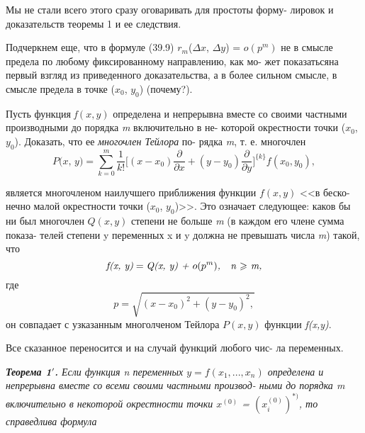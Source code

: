 \documentclass[10pt]{book}
\renewcommand{\geq}{\geqslant}
\begin{document}
\begin{spacing}{0.96}
	   Мы не стали всего этого сразу оговаривать для простоты форму-\linebreak
	   лировок и доказательств теоремы 1 и ее следствия.
		
		Подчеркнем еще, что в формуле (39.9) $r_m$($\Delta x$, $\Delta y$) = $o(p^m)$ \linebreak
		не в смысле предела по любому фиксированному направлению, как мо- \linebreak
		жет показатьсяна первый взгляд из приведенного доказательства,\linebreak
		а в более сильном смысле, в смысле предела в точке  ($x_0$, $y_0$) (почему?).
	\end{spacing}		
		\setlength{\parskip}{0.05cm}
	\begin{spacing}{0.9}
		\footnotesize{ Пусть функция \textit {f}$(x, y)$ определена и непрерывна \linebreak
		вместе со своими частными производными до порядка \textit {m}  включительно в не- \linebreak
		которой окрестности точки ($x_0$, $y_0$). Доказать, что ее \textit {многочлен Тейлора} по- \linebreak рядка \textit {m}, т. е. многочлен \scriptsize{
		$$\textit{P(x, y)} = \sum\limits_{k = 0}^m \frac{1}{k!} \bigl[(x- x_0) \frac{\partial}{\partial x} + (y- y_0) \frac{\partial}{\partial y}\bigr]^{\{k\}} \textit {f}(x_0, y_0) ,$$}
	
		\noindent является многочленом наилучшего приближения функции $\textit{f}(x, y)$ <<в беско- \linebreak
		нечно малой окрестности точки ($x_0$, $y_0$)>>. Это означает следующее: каков бы ни \linebreak
		был многочлен $Q(x, y)$ степени не больше \textit {m} (в каждом его члене сумма показа- \linebreak
		телей степени y переменных x и y должна не превышать числа \textit{m}) такой, что
		 \scriptsize{	$$\textit {f(x, y)} = \textit{Q(x, y) + $o(p^m)$,\quad n $\geq$ m,}$$}
		\noindent где  \scriptsize{ $$p=\sqrt{(x - x_0)^2 + (y-y_0)^2,}$$ } он совпадает с узказанным многолченом Тейлора $P(x, y)$ функции  \textit{f(x,y)}. 
		}
	\end{spacing}	
	    Все сказанное переносится и на случай функций любого чис- \linebreak
	    ла переменных.
	   
	    \textit{\textbf{Теорема 1$'$.} Если функция n переменных $y = \textit{f}(x_1, ..., x_n)$ \linebreak определена и непрерывна вместе со всеми своими частными производ- \linebreak
	    ными до порядка \textit {m} включительно в некоторой окрестности точки
	    	$x^{(0)}$ = $(x_{i}^{(0)})^{*)}$, то справедлива формула}
	   
\end{document}

